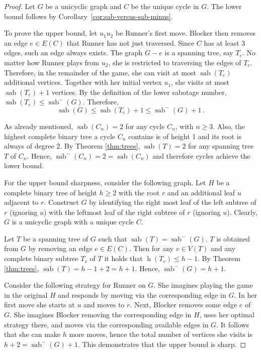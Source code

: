 \documentclass[12pt]{article}
\DeclareMathOperator{\sab}{\mathrm{sab}}
\DeclareMathOperator{\height}{\mathrm{h}}
\begin{document}
\begin{proof}
Let $G$ be a unicyclic graph and $C$ be the unique cycle in $G$. The lower bound follows by Corollary~\ref{cor:sab-versus-sab-minus}. 

To prove the upper bound, let $u_1 u_2$ be Runner's first move. Blocker then removes an edge $e\in E(C)$ that Runner has not just traversed. Since $C$ has at least 3 edges, such an edge always exists. The graph $G-e$ is a spanning tree, say $T_e$. No matter how Runner plays from $u_2$, she is restricted to traversing the edges of $T_e$. Therefore, in the remainder of the game, she can visit at most $\sab(T_e)$ additional vertices. Together with her initial vertex $u_1$, she visits at most $\sab(T_e) + 1$ vertices. By the definition of the lower sabotage number, $\sab(T_e) \le \sab^{-}(G)$. Therefore, 
$$\sab(G) \le \sab(T_e) + 1 \le \sab^{-}(G) + 1\,.$$

As already mentioned, $\sab(C_n)=2$ for any cycle $C_n$, with $n\geq 3$. Also, the highest complete binary tree a cycle $C_n$ contains is of height 1 and its root is always of degree 2. By Theorem \ref{thm:trees}, $\sab(T)=2$ for any spanning tree $T$ of $C_n$. Hence, $\sab^{-}(C_n) = 2 = \sab(C_n)$ and therefore cycles achieve the lower bound.

For the upper bound sharpness, consider the following graph. Let $H$ be a complete binary tree of height $h\geq 2$ with the root $r$ and an additional leaf $u$ adjacent to $r$. Construct $G$ by identifying the right most leaf of the left subtree of $r$ (ignoring $u$) with the leftmost leaf of the right subtree of $r$ (ignoring $u$). Clearly, $G$ is a unicyclic graph with a unique cycle $C$. 

Let $T$ be a spanning tree of $G$ such that $\sab(T)=\sab^{-}(G)$. $T$ is obtained from $G$ by removing an edge $e\in E(C)$. Then for any $v\in V(T)$ and any complete binary subtree $T_v$ of $T$ it holds that $\height(T_v) \leq h-1$. By Theorem \ref{thm:trees}, $\sab(T) = h - 1 + 2 = h+1$. Hence, $\sab^{-}(G) = h+1$.

Consider the following strategy for Runner on $G$. She imagines playing the game in the original $H$ and responds by moving via the corresponding edge in $G$. In her first move she starts at $u$ and moves to $r$. Next, Blocker removes some edge $e$ of $G$. She imagines Blocker removing the corresponding edge in $H$, uses her optimal strategy there, and moves via the corresponding available edges in $G$. It follows that she can make $h$ more moves, hence the total number of vertices she visits is $h+2 = \sab^{-}(G)+1$. This demonstrates that the upper bound is sharp.
\end{proof}
\end{document}
